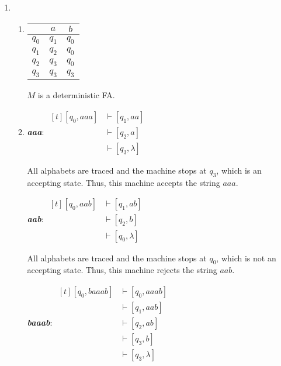 \documentclass[a4paper, 12pt]{article}
\begin{document}
    \begin{enumerate}
        \item
        \begin{enumerate}
            \item 
            \begin{tabular}{c|cc}
                 & $a$ & $b$  \\ \hline
             $q_0$ & $q_1$ & $q_0$ \\
             $q_1$ & $q_2$ & $q_0$ \\
             $q_2$ & $q_3$ & $q_0$ \\
             $q_3$ & $q_3$ & $q_3$
            \end{tabular}
            
            $M$ is a deterministic FA.
            \item
            \textbf{\textit{aaa}}: \( \begin{aligned}[t]
                [q_0, aaa] &\vdash [q_1, aa] \\
                &\vdash [q_2, a] \\
                &\vdash [q_3, \lambda]
            \end{aligned} \)

            All alphabets are traced and the machine stops at $q_3$, which is an accepting state. Thus, this machine accepts the string $aaa$.

            \textbf{\textit{aab}}: \( \begin{aligned}[t]
                [q_0, aab] &\vdash [q_1, ab] \\
                &\vdash [q_2, b] \\
                &\vdash [q_0, \lambda]
            \end{aligned} \)

            All alphabets are traced and the machine stops at $q_0$, which is not an accepting state. Thus, this machine rejects the string $aab$.

            \textbf{\textit{baaab}}: \( \begin{aligned}[t]
                [q_0, baaab] &\vdash [q_0, aaab] \\
                &\vdash [q_1, aab] \\
                &\vdash [q_2, ab] \\
                &\vdash [q_3, b] \\
                &\vdash [q_3, \lambda]
            \end{aligned} \)


\end{enumerate}
\end{enumerate}
\end{document}
